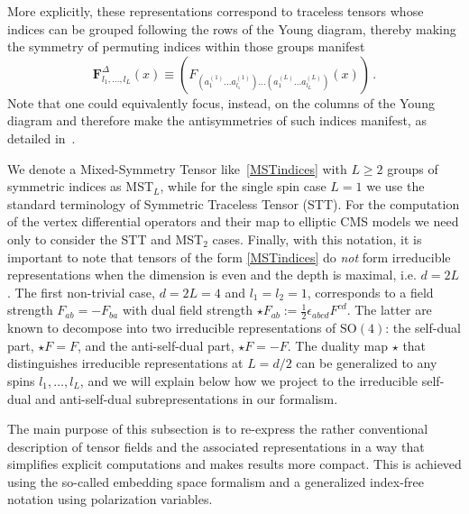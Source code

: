 \documentclass{article}
\begin{document}
More explicitly, these representations correspond to traceless tensors whose indices can be 
grouped following the rows of the Young diagram, thereby making the symmetry of permuting indices within those 
groups manifest
\begin{equation}
    \mathbf{F}^{\Delta}_{l_1,\dots,l_L}(x)\equiv \left(  F_{\left(a^{(1)}_1 \dots a^{(1)}_{l_1}\right)\dots 
    \left(a^{(L)}_1\dots a^{(L)}_{l_L}\right)}(x) \right)\,.
    \label{MSTindices}
    \end{equation}
Note that one could equivalently focus, instead, on the columns of the Young 
diagram and therefore make the antisymmetries of such indices manifest, as 
detailed in~\cite{Costa_2015}. 

We denote a Mixed-Symmetry Tensor like~\eqref{MSTindices} with $L\ge 2$ groups of 
symmetric indices as MST$_L$, while for the single spin case $L=1$ we use the 
standard terminology of Symmetric Traceless Tensor (STT). For the computation of 
the vertex differential operators and their map to elliptic CMS models we need only to consider the STT and MST$_2$ cases. Finally, with this notation, it is important to note that tensors of the form \eqref{MSTindices} do \emph{not} form irreducible representations when the dimension is even and the depth is maximal, i.e. $d=2L$. The first non-trivial case, $d=2L=4$ and $l_1=l_2=1$,  corresponds to a field strength $F_{ab}=-F_{ba}$ with dual field strength $\star F_{ab}:= \frac{1}{2} \epsilon_{abcd} F^{cd}$. The latter are known to decompose into two irreducible representations of $\mathrm{SO}(4)$: the self-dual part, $\star F = F$, and the anti-self-dual part, $\star F = -F$. The duality map $\star$ that distinguishes irreducible representations at $L=d/2$ can be generalized to any spins $l_1,\dots, l_L$, and we will explain below how we project to the irreducible self-dual and anti-self-dual subrepresentations in our formalism.
\smallskip 

The main purpose of this subsection is to re-express the rather conventional 
description of tensor fields and the associated representations in a way that 
simplifies explicit computations and makes results more compact. This is achieved  
using the so-called embedding space formalism and a generalized index-free notation 
using polarization variables. 
\end{document}
